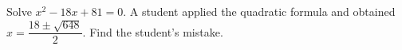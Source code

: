 Solve $x^2-18x+81=0$. A student applied the quadratic formula and obtained $x=\dfrac{18\pm\sqrt{648}}{2}$. Find the student's mistake.
